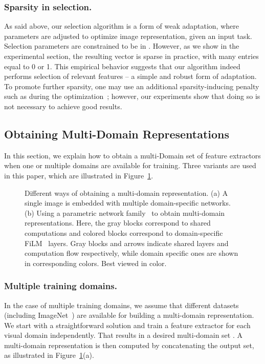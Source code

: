 \documentclass[runningheads]{llncs}
\begin{document}
\subsubsection{Sparsity in selection.} As said above, our selection
algorithm is a form of weak adaptation, where parameters  are adjusted
to optimize image representation, given an input task. Selection parameters
 are constrained to be in .
However, as we show in the experimental section, the resulting 
vector is sparse in practice, with many entries equal to 0 or 1. This empirical behavior
suggests that our algorithm indeed performs selection of relevant features -- a
simple and robust form of adaptation. To promote further sparsity, one may use
an additional sparsity-inducing penalty such as  during the
optimization~\cite{mairal2014sparse}; however, our experiments show that doing
so is not necessary to achieve good results.


\subsection{Obtaining Multi-Domain Representations}\label{sec:universal}
In this section, we explain how to obtain a multi-Domain set of feature
extractors  when one or multiple domains are available for
training. Three variants are used in this paper, which are illustrated in Figure~\ref{fig:universal}.
\begin{figure}[t!]
\centering
\caption{Different ways of obtaining a multi-domain representation. (a) A single
  image is embedded with multiple domain-specific networks. (b) Using a parametric
  network family~\cite{rebuffi2018efficient} to obtain multi-domain
  representations. Here, the gray blocks correspond to
  shared computations and colored blocks correspond to domain-specific
  FiLM~\cite{perez2018film} layers.
Gray blocks and arrows
  indicate shared layers and computation flow respectively, while domain specific
  ones are shown in corresponding colors. Best viewed in color.}
\label{fig:universal}
\end{figure}

\subsubsection{Multiple training domains.}\label{subsec:pf}
In the case of multiple training domains, we assume that  different datasets
(including ImageNet~\cite{imagenet})
are available for building a multi-domain representation. We start with a
straightforward solution and train a feature extractor 
for each visual domain independently. That results in a desired multi-domain set
. A multi-domain representation is then computed by
concatenating the output set, as illustrated in Figure~\ref{fig:universal}(a).
\end{document}
